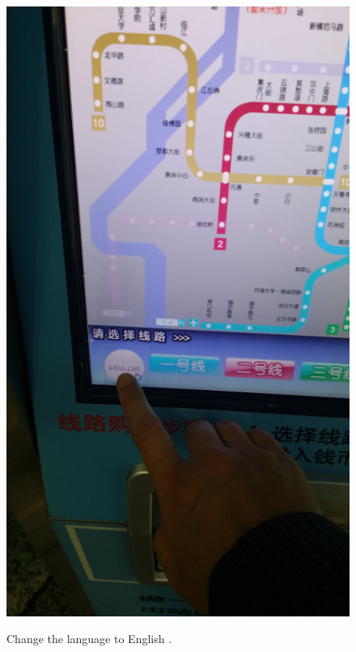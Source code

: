 \documentclass[11pt]{article}
\begin{document}
\begin{figure}[!h]
\begin{minipage}[t]{.5\textwidth}
       	 \includegraphics[scale=0.27]{20150331_110433.jpg} \\
	 	\caption{Change the language to English .\label{20150331_110412}}
    \end{minipage}%
 \end{figure}
\end{document}
